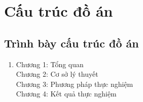 \section{Cấu trúc đồ án}
\subsection{Trình bày cấu trúc đồ án}
\begin{enumerate}
    \item []
    \hspace*{0.7cm}Chương 1: Tổng quan\\
    \hspace*{0.7cm}Chương 2: Cơ sở lý thuyết\\
    \hspace*{0.7cm}Chương 3: Phương pháp thực nghiệm\\
    \hspace*{0.7cm}Chương 4: Kết quả thực nghiệm\\
\end{enumerate}

